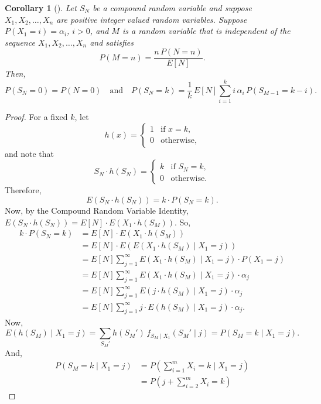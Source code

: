 \documentclass[11pt]{amsart}
\theoremstyle{definition}
\theoremstyle{plain}
\newtheorem{corollary}{Corollary}
\begin{document}
\begin{corollary}[{\cite{pekoz-ross}}]\label{cor:main}
Let $S_N$ be a compound random variable and suppose $X_1, X_2, \ldots, X_n$ are positive
integer valued random variables.  Suppose $P(X_1 = i) = \alpha_i$, $i > 0$, and $M$ is a
random variable that is independent of the sequence $X_1, X_2, \ldots, X_n$ and satisfies
\[
    P(M = n) = \frac{n\,P(N = n)}{E[N]}.
\]
Then,
\[
    P(S_N = 0) = P(N = 0)
    \quad \text{and} \quad
    P(S_N = k) = \frac{1}{k}\, E[N] \sum_{i=1}^{k} i\,\alpha_i\, P(S_{M-1} = k - i).
\]
\end{corollary}

\begin{proof}
For a fixed $k$, let
\[
    h(x) = \begin{cases} 1 & \text{if } x = k, \\ 0 & \text{otherwise,} \end{cases}
\]
and note that
\[
    S_N \cdot h(S_N) = \begin{cases} k & \text{if } S_N = k, \\ 0 & \text{otherwise.} \end{cases}
\]
Therefore,
\[
    E\!\left(S_N \cdot h(S_N)\right) = k \cdot P(S_N = k).
\]
Now, by the Compound Random Variable Identity,
$E(S_N \cdot h(S_N)) = E[N] \cdot E(X_1 \cdot h(S_M))$.  So,
\begin{align*}
k \cdot P(S_N = k)
    &= E[N] \cdot E\!\left(X_1 \cdot h(S_M)\right) \\
    &= E[N] \cdot E\!\left(E\!\left(X_1 \cdot h(S_M) \mid X_1 = j\right)\right) \\
    &= E[N] \sum_{j=1}^{\infty} E\!\left(X_1 \cdot h(S_M) \mid X_1 = j\right)
       \cdot P(X_1 = j) \\
    &= E[N] \sum_{j=1}^{\infty} E\!\left(X_1 \cdot h(S_M) \mid X_1 = j\right)
       \cdot \alpha_j \\
    &= E[N] \sum_{j=1}^{\infty} E\!\left(j \cdot h(S_M) \mid X_1 = j\right) \cdot \alpha_j \\
    &= E[N] \sum_{j=1}^{\infty} j \cdot E\!\left(h(S_M) \mid X_1 = j\right) \cdot \alpha_j.
\end{align*}
Now,
\[
    E\!\left(h(S_M) \mid X_1 = j\right)
    = \sum_{S_M'} h(S_M')\, f_{S_M \mid X_1}(S_M' \mid j)
    = P(S_M = k \mid X_1 = j).
\]
And,
\begin{align*}
P(S_M = k \mid X_1 = j)
    &= P\!\left(\sum_{i=1}^{m} X_i = k \;\Bigg|\; X_1 = j\right) \\
    &= P\!\left(j + \sum_{i=2}^{m} X_i = k\right)

\end{align*}
\end{proof}
\end{document}
